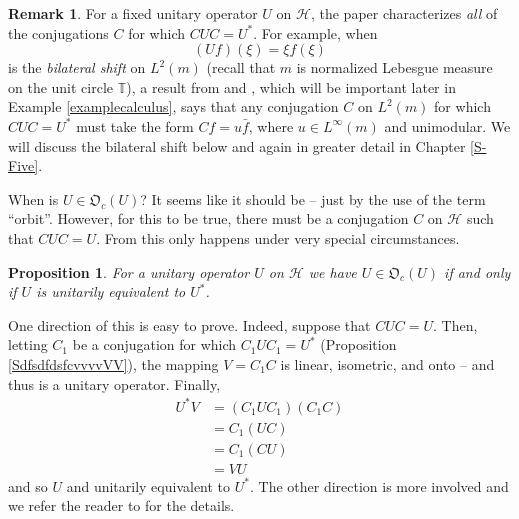 \documentclass{dis}
\theoremstyle{plain}
\newtheorem{Proposition}[equation]{Proposition}
\theoremstyle{definition}
\newtheorem{Remark}[equation]{Remark}
\def\T{\mathbb{T}}
\newcommand{\0}{{\color{lightgray}0}}
\begin{document}
\begin{Remark}\label{nNNnniiinnnndddD}
For a fixed unitary operator $U$ on $\mathcal{H}$, the paper \cite{MR4747045} characterizes {\em all} of the conjugations $C$ for which $CUC = U^{*}$. For example, when 
$$(U f)(\xi) = \xi f(\xi)$$ is the {\em bilateral shift} on $L^2(m)$ (recall that $m$ is normalized Lebesgue measure on the unit circle $\T$),  a result from  \cite[Theorem 4.1]{MR4040358}  and \cite[Theorem 2.2]{MR4083641}, which will be important later in Example \ref{examplecalculus}, says that any conjugation $C$ on $L^2(m)$ for which $C U C = U^{*}$ must take the form $C f = u \bar{f}$, where $u \in L^{\infty}(m)$ and unimodular. We will discuss the bilateral shift  below and again in greater detail  in Chapter \ref{S-Five}.
\end{Remark}


When is $U \in \mathfrak{O}_c(U)$? It seems like it should be -- just by the use of the term ``orbit''. However,  for this to be true, there must be a conjugation $C$ on $\mathcal{H}$ such that  $C U C = U$.  From \cite[Thm.~1.2]{MR4745001} this only happens under very special circumstances.

\begin{Proposition}\label{e0roiekfgdFF}
For a unitary operator  $U$ on $\mathcal{H}$ we have $U \in \mathfrak{O}_c(U)$ if and only if $U$ is unitarily equivalent to $U^{*}$.
\end{Proposition}

One direction of this is easy to prove. Indeed, suppose that $C U C = U$. Then, letting $C_1$ be a conjugation for which $C_1 U C_1 = U^{*}$ (Proposition \ref{SdfsdfdsfcvvvvVV}), the mapping $V = C_1 C$ is linear, isometric, and onto -- and thus is a unitary operator. Finally, 
\begin{align*}
U^{*} V & = (C_1 U C_1) (C_1 C)\\
& = C_1 (U C)\\
& = C_1 (C U)\\
& = V U
\end{align*}
and so $U$ and unitarily equivalent to $U^{*}$. 
The other direction is more involved and we refer the reader to \cite[Thm.~1.2]{MR4745001}  for the details. 
\end{document}
